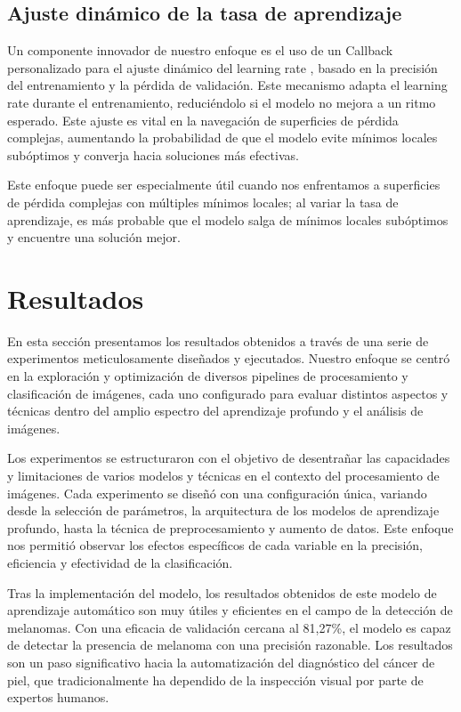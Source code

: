 \subsection{Ajuste dinámico de la tasa de aprendizaje}

Un componente innovador de nuestro enfoque es el uso de un Callback personalizado para el ajuste dinámico del learning rate , basado en la precisión del entrenamiento y la pérdida de validación. Este mecanismo adapta el learning rate durante el entrenamiento, reduciéndolo si el modelo no mejora a un ritmo esperado. Este ajuste es vital en la navegación de superficies de pérdida complejas, aumentando la probabilidad de que el modelo evite mínimos locales subóptimos y converja hacia soluciones más efectivas.

Este enfoque puede ser especialmente útil cuando nos enfrentamos a superficies de pérdida complejas con múltiples mínimos locales; al variar la tasa de aprendizaje, es más probable que el modelo salga de mínimos locales subóptimos y encuentre una solución mejor.

\section{Resultados}\label{sec:results}
En esta sección presentamos los resultados obtenidos a través de una serie de experimentos meticulosamente diseñados y ejecutados. Nuestro enfoque se centró en la exploración y optimización de diversos pipelines de procesamiento y clasificación de imágenes, cada uno configurado para evaluar distintos aspectos y técnicas dentro del amplio espectro del aprendizaje profundo y el análisis de imágenes.

Los experimentos se estructuraron con el objetivo de desentrañar las capacidades y limitaciones de varios modelos y técnicas en el contexto del procesamiento de imágenes. Cada experimento se diseñó con una configuración única, variando desde la selección de parámetros, la arquitectura de los modelos de aprendizaje profundo, hasta la técnica de preprocesamiento y aumento de datos. Este enfoque nos permitió observar los efectos específicos de cada variable en la precisión, eficiencia y efectividad de la clasificación.

Tras la implementación del modelo, los resultados obtenidos de este modelo de aprendizaje automático son muy útiles y eficientes en el campo de la detección de melanomas. Con una eficacia de validación cercana al 81,27\%, el modelo es capaz de detectar la presencia de melanoma con una precisión razonable. Los resultados son un paso significativo hacia la automatización del diagnóstico del cáncer de piel, que tradicionalmente ha dependido de la inspección visual por parte de expertos humanos.

